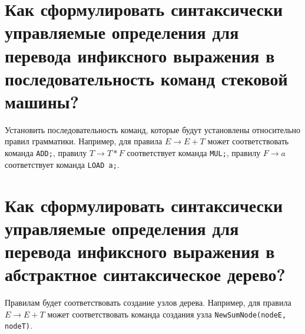\section{Как сформулировать синтаксически управляемые определения для перевода инфиксного выражения в последовательность команд стековой машины?}

Установить последовательность команд, которые будут установлены относительно правил грамматики.
	Например, для правила $E \rightarrow E + T$ может соответствовать команда \texttt{ADD;}, правилу 
	$T \rightarrow T * F$ соответствует команда \texttt{MUL;}, правилу $F \rightarrow a$ соответствует команда \texttt{LOAD a;}.

\section{Как сформулировать синтаксически управляемые определения для перевода инфиксного выражения в абстрактное синтаксическое дерево?}

Правилам будет соответствовать создание узлов дерева.
Например, для правила $E \rightarrow E + T$ 
может соответствовать команда создания узла \texttt{NewSumNode(nodeE, nodeT)}.

